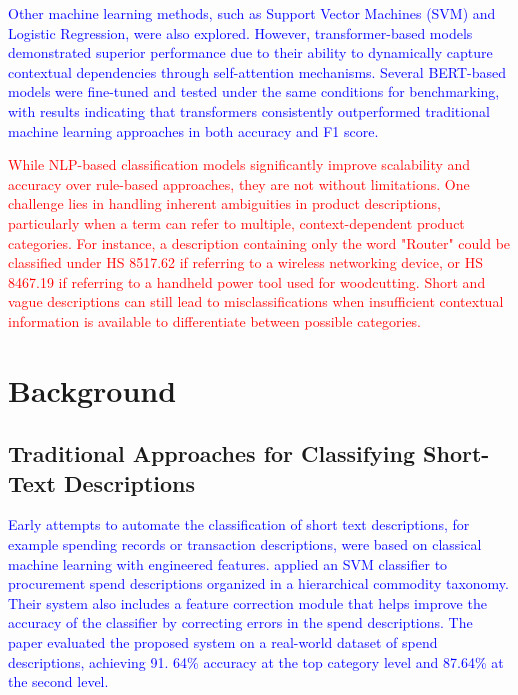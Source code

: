 \documentclass[mnsc,nonblindrev]{informs3} %
\begin{document}
\textcolor{blue}{Other machine learning methods, such as Support Vector Machines (SVM) and Logistic Regression, were also explored. However, transformer-based models demonstrated superior performance due to their ability to dynamically capture contextual dependencies through self-attention mechanisms. Several BERT-based models were fine-tuned and tested under the same conditions for benchmarking, with results indicating that transformers consistently outperformed traditional machine learning approaches in both accuracy and F1 score.}

\textcolor{red}{While NLP-based classification models significantly improve scalability and accuracy over rule-based approaches, they are not without limitations. One challenge lies in handling inherent ambiguities in product descriptions, particularly when a term can refer to multiple, context-dependent product categories. For instance, a description containing only the word "Router" could be classified under HS 8517.62 if referring to a wireless networking device, or HS 8467.19 if referring to a handheld power tool used for woodcutting. Short and vague descriptions can still lead to misclassifications when insufficient contextual information is available to differentiate between possible categories.}

\section{Background}

\subsection{Traditional Approaches for Classifying Short-Text Descriptions}

\textcolor{blue}{Early attempts to automate the classification of short text descriptions, for example spending records or transaction descriptions, were based on classical machine learning with engineered features. \citet{mukherjee2008classifying} applied an SVM classifier to procurement spend descriptions organized in a hierarchical commodity taxonomy. Their system also includes a feature correction module that helps improve the accuracy of the classifier by correcting errors in the spend descriptions. The paper evaluated the proposed system on a real-world dataset of spend descriptions, achieving 91. 64\% accuracy at the top category level and 87.64\% at the second level.}
\end{document}
